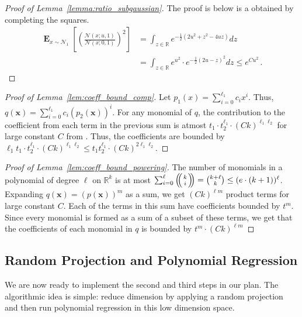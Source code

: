 \documentclass[10pt,a4paper]{article}
\renewcommand\vec[1]{\mathbf{#1}}
\DeclareMathOperator*{\E}{\mathbf{E}}
\def\multichoose#1#2{\ensuremath{\left(\kern-.3em\left(\genfrac{}{}{0pt}{}{#1}{#2}\right)\kern-.3em\right)}}
\newcommand{\R}{\mathbb{R}}
\newcommand{\1}{\Ind}
\newcommand{\x}{\vec x}
\newcommand{\Gauss}{\mathcal{N}}
\begin{document}
\begin{proof}[Proof of Lemma~\ref{lemma:ratio_subgaussian}]
\label{proof:ratio_subgaussian}
The proof is below is a obtained by completing the squares.
    \begin{align*}
    \E_{x\sim \Gauss_1}\left[\left(\frac{\Gauss(x;u,1)}{\Gauss(x;0,1)}\right)^2\right]&=\int_{z\in \R} e^{-\frac{1}{2}\left(2u^2+z^2-4uz\right)}dz\\
    &=\int_{z\in \R} e^{{u^2}}\cdot e^{-\frac{1}{2}({2u}-z)^2}dz
    \leq  e^{{Cu^2}} \,.
      \end{align*}
\end{proof}



\begin{proof}[Proof of Lemma~\ref{lem:coeff_bound_comp}]
\label{proof:coeff_bound_comp}
    Let $p_1(x)=\sum_{i=0}^{\ell_1}c_i x^{i}$. Thus, $q(\x)=\sum_{i=0}^{\ell_1}c_i\left(p_2(\x)\right)^i$. For any monomial of $q$, the contribution to the coefficient from each term in the previous sum is atmost $t_1\cdot t_2^{\ell_1}\cdot (Ck)^{\ell_1 \ell_2}$ for large constant $C$ from . Thus, the coefficients are bounded by $\ell_1 t_1\cdot t_2^{\ell_1}\cdot(Ck)^{\ell_1 \ell_2}\leq t_1t_2^{\ell_1}\cdot (Ck)^{2\ell_1 \ell_2}$.
\end{proof}

\begin{proof}[Proof of Lemma~\ref{lem:coeff_bound_powering}]
    The number of monomials in a polynomial of degree $\ell$ on $\R^{k}$ is at most $\sum_{i=0}^{\ell}\multichoose{k}{i}=\binom{k+\ell}{k}\leq (e\cdot(k+1))^{\ell}$. Expanding $q(\x)=(p(\x))^{m}$ as a sum, we get $(Ck)^{\ell m}$ product terms for large constant $C$. Each of the terms in this sum have coefficients bounded by $t^m$. Since every monomial is formed as a sum of a subset of these terms, we get that the coefficients of each monomial in $q$ is bounded by $t^m\cdot (Ck)^{\ell m}$
\end{proof}
\subsection{Random Projection and Polynomial Regression}

We are now ready to implement the second and third steps in our plan. The algorithmic idea is simple: reduce dimension by applying a random projection and then run polynomial regression in this low dimension space.
\end{document}

